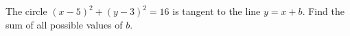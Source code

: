 The circle $(x - 5)^2 + (y - 3)^2 = 16$ is tangent to the line $y = x + b$. Find the sum of all possible values of $b$.
